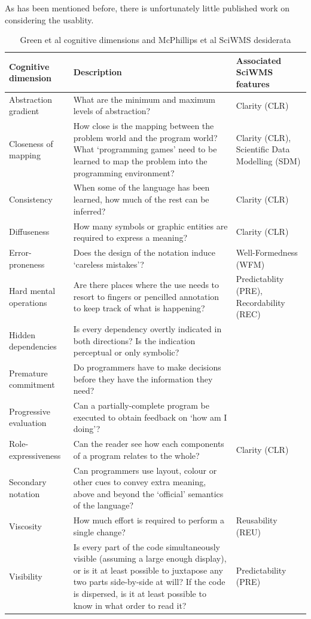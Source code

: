 \documentclass[a4paper,10pt]{scrreprt}
\begin{document}
As has been mentioned before, there is unfortunately little published work on considering the usablity.
\begin{table}[h!]
\begin{adjustwidth}{-1in}{-1in}%
\begin{tabular}{|l|p{8cm}|p{6cm}|}
\hline \textbf{Cognitive dimension}  & \textbf{Description} & \textbf{Associated SciWMS features} \\ 
\hline Abstraction gradient & What are the minimum and maximum levels of abstraction? & Clarity (CLR)  \\ 
\hline Closeness of mapping & How close is the mapping between the problem world and the program world? What `programming games' need to be learned to map the problem into the programming environment? & Clarity (CLR), Scientific Data Modelling (SDM) \\ 
\hline Consistency & When some of the language has been learned, how much of the rest can be inferred? & Clarity (CLR) \\ 
\hline Diffuseness & How many symbols or graphic entities are required to express a meaning? & Clarity (CLR) \\ 
\hline Error-proneness & Does the design of the notation induce `careless mistakes'? & Well-Formedness (WFM) \\ 
\hline Hard mental operations & Are there places where the use needs to resort to fingers or pencilled annotation to keep track of what is happening? & Predictablity (PRE), Recordability (REC) \\ 
\hline Hidden dependencies & Is every dependency overtly indicated in both directions? Is the indication perceptual or only symbolic? &  \\ 
\hline Premature commitment & Do programmers have to make decisions before they have the information they need? & \\ 
\hline Progressive evaluation & Can a partially-complete program be executed to obtain feedback on `how am I doing'? &  \\ 
\hline Role-expressiveness & Can the reader see how each components of a program relates to the whole? & Clarity (CLR)  \\ 
\hline Secondary notation & Can programmers use layout, colour or other cues to convey extra meaning, above and beyond the `official' semantics of the language? &  \\ 
\hline Viscosity & How much effort is required to perform a single change? & Reusability (REU) \\ 
\hline Visibility & Is every part of the code simultaneously visible (assuming a large enough display), or is it at least possible to juxtapose any two parts side-by-side at will? If the code is dispersed, is it at least possible to know in what order to read it? & Predictability (PRE) \\ 
\hline 
\end{tabular} 
\end{adjustwidth}
\caption{Green et al cognitive dimensions and McPhillips et al SciWMS desiderata}
\label{tab:green_mcphillips_dimensions}
\end{table}
\end{document}
